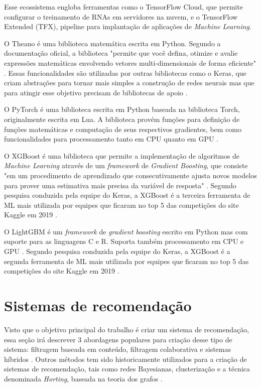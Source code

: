 Esse ecossistema engloba ferramentas como o TensorFlow Cloud, que permite configurar o treinamento de RNAs em servidores na nuvem, e o TensorFlow Extended (TFX), pipeline para implantação de aplicações de \textit{Machine Learning}.

O Theano é uma biblioteca matemática escrita em Python. Segundo a documentação oficial, a biblioteca "permite que você defina, otimize e avalie expressões matemáticas envolvendo vetores multi-dimensionais de forma eficiente" . Essas funcionalidades são utilizadas por outras bibliotecas como o Keras, que criam abstrações para tornar mais simples a construção de redes neurais mas que para atingir esse objetivo precisam de bibliotecas de apoio \cite{theano16}.

O PyTorch é uma biblioteca escrita em Python baseada na biblioteca Torch, originalmente escrita em Lua. A biblioteca provém funções para definição de funções matemáticas e computação de seus respectivos gradientes, bem como funcionalidades para processamento tanto em CPU quanto em GPU \cite{ketkar17}. 

O XGBoost é uma biblioteca que permite a implementação de algoritmos de \textit{Machine Learning} através de um \textit{framework} de \textit{Gradient Boosting}, que consiste "em um procedimento de aprendizado que consecutivamente ajusta novos modelos para prover uma estimativa mais precisa da variável de resposta" . Segundo pesquisa conduzida pela equipe do Keras, a XGBoost é a terceira ferramenta de ML mais utilizada por equipes que ficaram no top 5 das competições do site Kaggle em 2019 \cite{keras202}.

O LightGBM é um \textit{framework} de \textit{gradient boosting} escrito em Python mas com suporte para as linguagens C e R. Suporta também processamento em CPU e GPU \cite{lgbm20}. Segundo pesquisa conduzida pela equipe do Keras, a XGBoost é a segunda ferramenta de ML mais utilizada por equipes que ficaram no top 5 das competições do site Kaggle em 2019 \cite{keras202}.

\section{Sistemas de recomendação} \label{sist-rec} 
Visto que o objetivo principal do trabalho é criar um sistema de recomendação, essa seção irá descrever 3 abordagens populares para criação desse tipo de sistema: filtragem baseada em conteúdo, filtragem colaborativa e sistemas híbridos \cite{fressato19}. Outros métodos tem sido historicamente utilizados para a criação de sistemas de recomendação, tais como redes Bayesianas, clusterização \cite{li05} e a técnica denominada \textit{Horting}, baseada na teoria dos grafos \cite{aggarwal99}.

